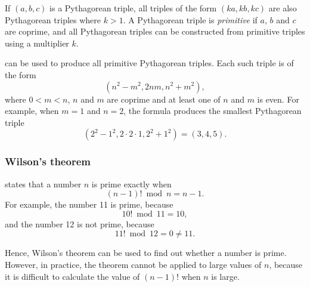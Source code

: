 If $(a,b,c)$ is a Pythagorean triple,
all triples of the form $(ka,kb,kc)$
are also Pythagorean triples where $k>1$.
A Pythagorean triple is \emph{primitive} if
$a$, $b$ and $c$ are coprime,
and all Pythagorean triples can be constructed
from primitive triples using a multiplier $k$.

 can be used to produce
all primitive Pythagorean triples.
Each such triple is of the form
\[(n^2-m^2,2nm,n^2+m^2),\]
where $0<m<n$, $n$ and $m$ are coprime
and at least one of $n$ and $m$ is even.
For example, when $m=1$ and $n=2$, the formula
produces the smallest Pythagorean triple
\[(2^2-1^2,2\cdot2\cdot1,2^2+1^2)=(3,4,5).\]

\subsubsection{Wilson's theorem}


states that a number $n$
is prime exactly when
\[(n-1)! \bmod n = n-1.\]
For example, the number 11 is prime, because
\[10! \bmod 11 = 10,\]
and the number 12 is not prime, because
\[11! \bmod 12 = 0 \neq 11.\]

Hence, Wilson's theorem can be used to find out
whether a number is prime. However, in practice, the theorem cannot be
applied to large values of $n$, because it is difficult
to calculate the value of $(n-1)!$ when $n$ is large.


